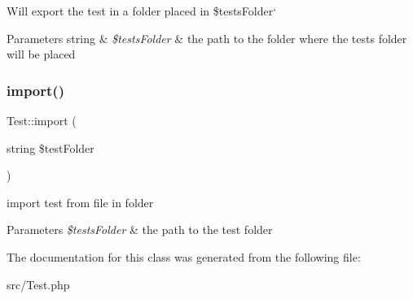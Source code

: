 Will export the test in a folder placed in \$tests\+Folder` 
\begin{DoxyParams}[1]{Parameters}
string & {\em \$tests\+Folder} & the path to the folder where the test\textquotesingle{}s folder will be placed \\
\hline
\end{DoxyParams}
\mbox{\label{classTest_ab1460ff08b4bc23fe5a01b5afcc18dd2}} 
\subsubsection{\texorpdfstring{import()}{import()}}
{\footnotesize\ttfamily Test\+::import (\begin{DoxyParamCaption}\item[{string}]{\$test\+Folder }\end{DoxyParamCaption})}



import test from file in folder 


\begin{DoxyParams}{Parameters}
{\em \$tests\+Folder} & the path to the test folder \\
\hline
\end{DoxyParams}


The documentation for this class was generated from the following file\+:\begin{DoxyCompactItemize}
\item 
src/Test.\+php\end{DoxyCompactItemize}
